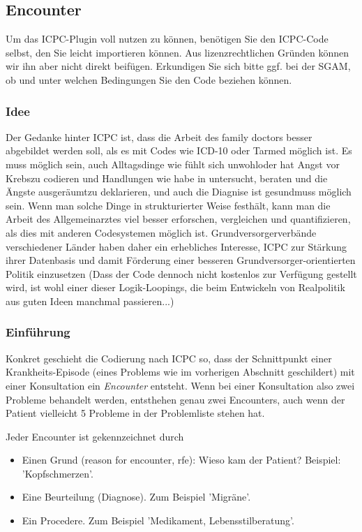 \subsection{Encounter}
Um das ICPC-Plugin voll nutzen zu können, benötigen Sie den ICPC-Code selbst, den Sie leicht importieren können. Aus lizenzrechtlichen Gründen können wir ihn aber nicht direkt beifügen. Erkundigen Sie sich bitte ggf. bei der SGAM, ob und unter welchen Bedingungen Sie den Code beziehen können.
\subsubsection{Idee}
Der Gedanke hinter ICPC ist, dass die Arbeit des family doctors besser abgebildet werden soll, als es mit Codes wie ICD-10 oder Tarmed möglich ist. Es muss möglich sein, auch Alltagsdinge wie \glqq fühlt sich unwohl\grqq oder \glqq hat Angst vor Krebs\grqq zu codieren und Handlungen wie \glqq habe in untersucht, beraten und die Ängste ausgeräumt\grqq zu deklarieren, und auch die Diagnise \glqq ist gesund\grqq muss möglich sein. Wenn man solche Dinge in strukturierter Weise festhält, kann man die Arbeit des Allgemeinarztes viel besser erforschen, vergleichen und quantifizieren, als dies mit anderen Codesystemen möglich ist. Grundversorgerverbände verschiedener Länder haben daher ein erhebliches Interesse, ICPC zur Stärkung ihrer Datenbasis und damit Förderung einer besseren Grundversorger-orientierten Politik einzusetzen (Dass der Code dennoch nicht kostenlos zur Verfügung gestellt wird, ist wohl einer dieser Logik-Loopings, die beim Entwickeln von Realpolitik aus guten Ideen manchmal passieren...)

\subsubsection{Einführung}
Konkret geschieht die Codierung nach ICPC so, dass der Schnittpunkt einer Krankheits-Episode (eines Problems wie im vorherigen Abschnitt geschildert) mit einer Konsultation ein \textit{Encounter} entsteht. Wenn bei einer Konsultation also zwei Probleme behandelt werden, entsthehen genau zwei Encounters, auch wenn der Patient vielleicht 5 Probleme in der Problemliste stehen hat.

Jeder Encounter ist gekennzeichnet durch
\begin{itemize}
\item Einen Grund (reason for encounter, rfe): Wieso kam der Patient? Beispiel: 'Kopfschmerzen'.
\item Eine Beurteilung (Diagnose). Zum Beispiel 'Migräne'.
\item Ein Procedere. Zum Beispiel 'Medikament, Lebensstilberatung'.
\end{itemize}


